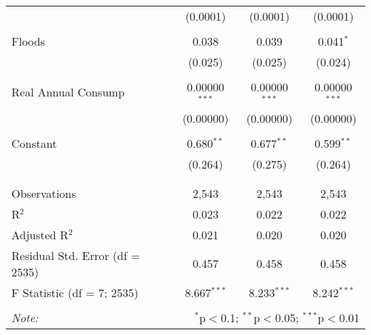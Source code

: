 \begin{table}[!htbp]
\begin{tabular}{@{\extracolsep{5pt}}lccc}
  & (0.0001) & (0.0001) & (0.0001) \\ 
  & & & \\ 
 Floods & 0.038 & 0.039 & 0.041$^{*}$ \\ 
  & (0.025) & (0.025) & (0.024) \\ 
  & & & \\ 
 Real Annual Consump & 0.00000$^{***}$ & 0.00000$^{***}$ & 0.00000$^{***}$ \\ 
  & (0.00000) & (0.00000) & (0.00000) \\ 
  & & & \\ 
 Constant & 0.680$^{**}$ & 0.677$^{**}$ & 0.599$^{**}$ \\ 
  & (0.264) & (0.275) & (0.264) \\ 
  & & & \\ 
\hline \\[-1.8ex] 
Observations & 2,543 & 2,543 & 2,543 \\ 
R$^{2}$ & 0.023 & 0.022 & 0.022 \\ 
Adjusted R$^{2}$ & 0.021 & 0.020 & 0.020 \\ 
Residual Std. Error (df = 2535) & 0.457 & 0.458 & 0.458 \\ 
F Statistic (df = 7; 2535) & 8.667$^{***}$ & 8.233$^{***}$ & 8.242$^{***}$ \\ 
\hline 
\hline \\[-1.8ex] 
\textit{Note:}  & \multicolumn{3}{r}{$^{*}$p$<$0.1; $^{**}$p$<$0.05; $^{***}$p$<$0.01} \\ 
\end{tabular} 
\end{table} 
